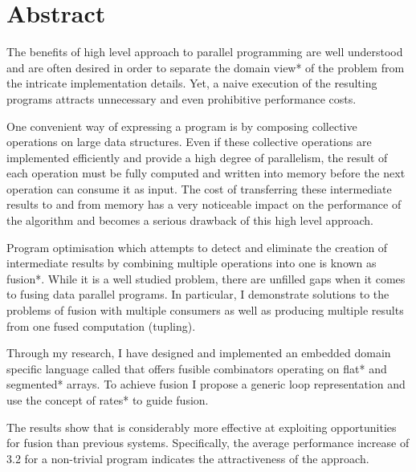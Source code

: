 \documentclass[preamble.tex]{subfiles}
\begin{document}
\clearpage

\chapter*{Abstract}

The benefits of high level approach to parallel programming are well understood and are often desired in order to separate the \*domain view* of the problem from the intricate implementation details. Yet, a naive execution of the resulting programs attracts unnecessary and even prohibitive performance costs.

One convenient way of expressing a program is by composing collective operations on large data structures. Even if these collective operations are implemented efficiently and provide a high degree of parallelism, the result of each operation must be fully computed and written into memory before the next operation can consume it as input. The cost of transferring these intermediate results to and from memory has a very noticeable impact on the performance of the algorithm and becomes a serious drawback of this high level approach.

Program optimisation which attempts to detect and eliminate the creation of intermediate results by combining multiple operations into one is known as \*fusion*. While it is a well studied problem, there are unfilled gaps when it comes to fusing data parallel programs. In particular, I demonstrate solutions to the problems of fusion with multiple consumers as well as producing multiple results from one fused computation (tupling).

Through my research, I have designed and implemented an embedded domain specific language called \LiveFusion that offers fusible combinators operating on \*flat* and \*segmented* arrays. To achieve fusion I propose a generic loop representation and use the concept of \*rates* to guide fusion.

The results show that \LiveFusion is considerably more effective at exploiting opportunities for fusion than previous systems. Specifically, the average performance increase of 3.2 for a non-trivial program indicates the attractiveness of the approach.


\end{document}
